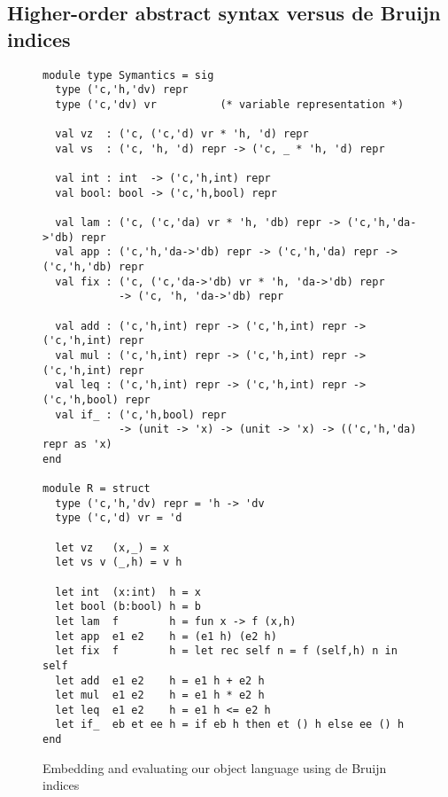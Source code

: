 \begin{comment}
\begin{code}
module EX1(S: Symantics) = struct
 open S
 let tfix () = app (fix (fun self -> self)) (int 1)
end;;
let module E =EX1(R) in E.tfix ();;
let module E =EX1(L) in E.tfix ();;
\end{code}
\end{comment}

\subsection{Higher-order abstract syntax versus de Bruijn indices}
\label{S:de-Bruijn}

\begin{figure}
\begin{floatrule}
\begin{BVerbatim}
module type Symantics = sig
  type ('c,'h,'dv) repr
  type ('c,'dv) vr			(* variable representation *)

  val vz  : ('c, ('c,'d) vr * 'h, 'd) repr
  val vs  : ('c, 'h, 'd) repr -> ('c, _ * 'h, 'd) repr

  val int : int  -> ('c,'h,int) repr
  val bool: bool -> ('c,'h,bool) repr

  val lam : ('c, ('c,'da) vr * 'h, 'db) repr -> ('c,'h,'da->'db) repr
  val app : ('c,'h,'da->'db) repr -> ('c,'h,'da) repr -> ('c,'h,'db) repr
  val fix : ('c, ('c,'da->'db) vr * 'h, 'da->'db) repr
            -> ('c, 'h, 'da->'db) repr

  val add : ('c,'h,int) repr -> ('c,'h,int) repr -> ('c,'h,int) repr
  val mul : ('c,'h,int) repr -> ('c,'h,int) repr -> ('c,'h,int) repr
  val leq : ('c,'h,int) repr -> ('c,'h,int) repr -> ('c,'h,bool) repr
  val if_ : ('c,'h,bool) repr
            -> (unit -> 'x) -> (unit -> 'x) -> (('c,'h,'da) repr as 'x)
end

module R = struct
  type ('c,'h,'dv) repr = 'h -> 'dv
  type ('c,'d) vr = 'd

  let vz   (x,_) = x
  let vs v (_,h) = v h

  let int  (x:int)  h = x
  let bool (b:bool) h = b
  let lam  f        h = fun x -> f (x,h)
  let app  e1 e2    h = (e1 h) (e2 h)
  let fix  f        h = let rec self n = f (self,h) n in self
  let add  e1 e2    h = e1 h + e2 h
  let mul  e1 e2    h = e1 h * e2 h
  let leq  e1 e2    h = e1 h <= e2 h
  let if_  eb et ee h = if eb h then et () h else ee () h
end
\end{BVerbatim}
\end{floatrule}
\caption{Embedding and evaluating our object language using de Bruijn indices}
\label{fig:de-Bruijn}
\end{figure}

